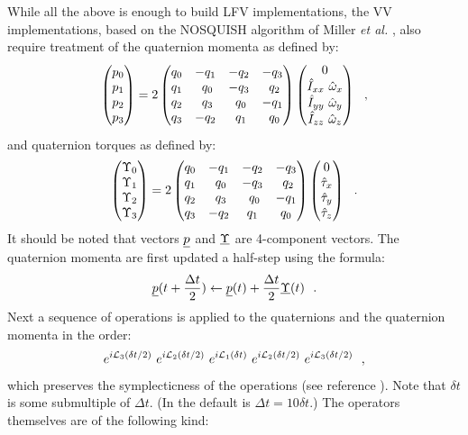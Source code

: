 While all the above is enough to build LFV implementations, the VV implementations,
based on the NOSQUISH algorithm of Miller {\em et al.}
\cite{miller-02a}, also require treatment of the quaternion momenta as defined by:
\begin{equation}
\begin{pmatrix}
p_0 \cr p_1 \cr p_2 \cr p_3 \cr
\end{pmatrix}
= 2
\begin{pmatrix}
q_0 & -q_1 & -q_2 & -q_3 \cr
q_1 & ~q_0 & -q_3 & ~q_2 \cr
q_2 & ~q_3 & ~q_0 & -q_1 \cr
q_3 & -q_2 & ~q_1 & ~q_0
\end{pmatrix}
\begin{pmatrix}
0 \cr \hat{I}_{xx}~\hat{\omega}_{x} \cr \hat{I}_{yy}~\hat{\omega}_{y} \cr \hat{I}_{zz}~\hat{\omega}_{z}
\end{pmatrix}~~,
\end{equation}
and quaternion torques as defined by:
\begin{equation}
\begin{pmatrix}
\Upsilon_0 \cr \Upsilon_1 \cr \Upsilon_2 \cr \Upsilon_3 \cr
\end{pmatrix}
= 2
\begin{pmatrix}
q_0 & -q_1 & -q_2 & -q_3 \cr
q_1 & ~q_0 & -q_3 & ~q_2 \cr
q_2 & ~q_3 & ~q_0 & -q_1 \cr
q_3 & -q_2 & q_1 & q_0
\end{pmatrix}
\begin{pmatrix}
0 \cr \hat{\tau}_{x} \cr \hat{\tau}_{y} \cr \hat{\tau}_{z}
\end{pmatrix}~~.
\end{equation}
It should be noted that vectors $\mbox{$\underline{p}$}$ and $\mbox{$\underline{\Upsilon}$}$ are 4-component vectors.
The quaternion momenta are first updated a half-step using the formula:
\begin{equation}
\mbox{$\underline{p}$}(t+{\Delta t\over 2}) \leftarrow \mbox{$\underline{p}$}(t)+{\Delta t \over 2} \mbox{$\underline{\Upsilon}$}(t)~~.
\end{equation}
Next a sequence of operations is applied to the quaternions and the quaternion momenta in the order:
\begin{equation}
e^{i{\cal L}_{3}(\delta t/2)}~e^{i{\cal L}_{2}(\delta t/2)}~e^{i{\cal L}_{1}(\delta t)}~e^{i{\cal L}_{2}(\delta t/2)}~e^{i{\cal L}_{3}(\delta t/2)}~~,
\label{ns1}
\end{equation}
which preserves the symplecticness of the operations (see reference \cite{martyna-96a}).
Note that $\delta t$ is some submultiple of $\Delta t$.  (In \D the default is $\Delta t=10
\delta t$.)  The operators themselves are of the following kind:
